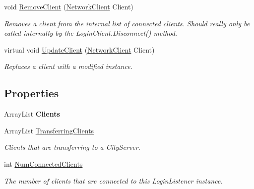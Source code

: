 \begin{DoxyCompactItemize}
void \hyperlink{class_gonzo_net_1_1_listener_a601388b7aed08d038bd2ecc50ff35456}{Remove\+Client} (\hyperlink{class_gonzo_net_1_1_network_client}{Network\+Client} Client)
\begin{DoxyCompactList}\small\item\em Removes a client from the internal list of connected clients. Should really only be called internally by the Login\+Client.\+Disconnect() method. \end{DoxyCompactList}\item 
virtual void \hyperlink{class_gonzo_net_1_1_listener_a567f57e9f8648bc1a8e530d7efb9dc2a}{Update\+Client} (\hyperlink{class_gonzo_net_1_1_network_client}{Network\+Client} Client)
\begin{DoxyCompactList}\small\item\em Replaces a client with a modified instance. \end{DoxyCompactList}\end{DoxyCompactItemize}
\subsection*{Properties}
\begin{DoxyCompactItemize}
\item 
\hypertarget{class_gonzo_net_1_1_listener_a487f529d308a1e04f94cffffc784a4a5}{Array\+List {\bfseries Clients}}\label{class_gonzo_net_1_1_listener_a487f529d308a1e04f94cffffc784a4a5}

\item 
Array\+List \hyperlink{class_gonzo_net_1_1_listener_a7e3a4dcd410cd2fa3e04509a4759d789}{Transferring\+Clients}
\begin{DoxyCompactList}\small\item\em Clients that are transferring to a City\+Server. \end{DoxyCompactList}\item 
int \hyperlink{class_gonzo_net_1_1_listener_a7a504c01b6b60b72846db483ac45de22}{Num\+Connected\+Clients}
\begin{DoxyCompactList}\small\item\em The number of clients that are connected to this Login\+Listener instance. \end{DoxyCompactList}\end{DoxyCompactItemize}


